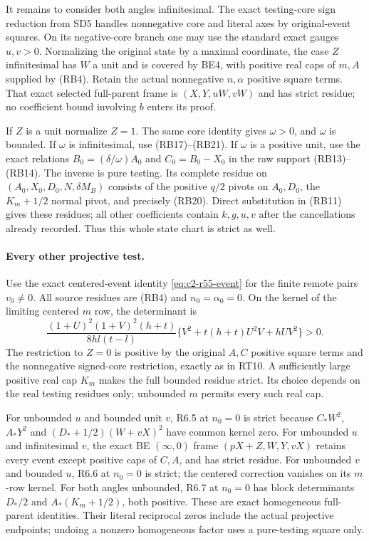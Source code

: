 It remains to consider both angles infinitesimal. The exact testing-core
sign reduction from SD5 handles nonnegative core and literal axes by
original-event squares. On its negative-core branch one may use the
standard exact gauges $u,v>0$. Normalizing the original state by a
maximal coordinate, the case $Z$ infinitesimal has $W$ a unit and is
covered by BE4, with positive real caps of $m,A$ supplied by (RB4).
Retain the actual nonnegative $n,\alpha$ positive square terms. That exact selected
full-parent frame is $(X,Y,uW,vW)$ and has strict residue; no coefficient
bound involving $b$ enters its proof.

If $Z$ is a unit normalize $Z=1$. The same core identity gives
$\omega>0$, and $\omega$ is bounded. If $\omega$ is infinitesimal,
use (RB17)--(RB21). If $\omega$ is a positive unit, use the exact
relations $B_0=(\delta/\omega)A_0$ and $C_0=B_0-X_0$ in the raw
support (RB13)--(RB14). The inverse is pure testing. Its complete
residue on $(A_0,X_0,D_0,N,\delta M_B)$ consists of the positive
$q/2$ pivots on $A_0,D_0$, the $K_m+1/2$ normal pivot, and precisely
(RB20). Direct substitution in (RB11) gives these residues; all other
coefficients contain $k,g,u,v$ after the cancellations already recorded.
Thus this whole state chart is strict as well.

\paragraph{Every other projective test.}
Use the exact centered-event identity \eqref{eq:c2-r55-event} for the finite remote pairs
$v_0\ne0$. All source residues are (RB4) and $n_0=\alpha_0=0$.
On the kernel of the limiting centered $m$ row, the determinant is
\[
 \frac{(1+U)^2(1+V)^2(h+t)}{8hl(t-l)}
       \{V^2+t(h+t)U^2V+hUV^2\}>0.                 \tag{RB24}
\]
The restriction to $Z=0$ is positive by the original $A,C$ positive square terms
and the nonnegative signed-core restriction, exactly as in RT10.
A sufficiently large positive real cap $K_m$ makes the full bounded
residue strict. Its choice depends on the real testing residues only;
unbounded $m$ permits every such real cap.

For unbounded $u$ and bounded unit $v$, R6.5 at $n_0=0$ is strict
because $C_*W^2$, $A_*Y^2$ and $(D_*+1/2)(W+vX)^2$ have common
kernel zero. For unbounded $u$ and infinitesimal $v$, the exact
BE $(\infty,0)$ frame $(pX+Z,W,Y,vX)$ retains every event except
positive caps of $C,A$, and has strict residue. For unbounded $v$
and bounded $u$, R6.6 at $n_0=0$ is strict; the centered correction
vanishes on its $m$-row kernel. For both angles unbounded, R6.7 at
$n_0=0$ has block determinants $D_*/2$ and
$A_*(K_m+1/2)$, both positive. These are exact homogeneous full-parent
identities. Their literal reciprocal zeros include the actual projective
endpoints; undoing a nonzero homogeneous factor uses a pure-testing
square only.

